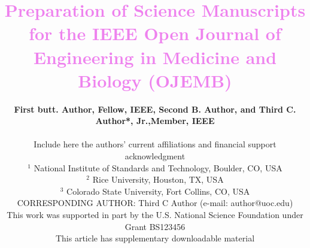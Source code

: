 \documentclass[journal]{IEEEtran}
\makeatletter
\renewcommand{\abstractname}{\textcolor{violet}{\textbf{ABSTRACT}} }
\def\abstract{\@IEEEtweakunitybaselinestretch{1.15}
	\@IEEEabskeysecsize\noindent\abstractname---\relax
	\fi\@IEEEgobbleleadPARNLSP}
\makeatother
\begin{document}
    
	\title{\vspace*{0.5cm}\textcolor{violet}{Preparation of Science Manuscripts for the IEEE Open Journal of Engineering in Medicine and Biology (OJEMB)}
	\vspace*{0.5cm}
	}	
	
	
	\author{\textbf{First butt. Author, Fellow, IEEE, Second B. Author, and Third C. Author*, Jr.,Member, IEEE}\\
		\vspace*{0.1cm}
		
		Include here the authors’ current affiliations and financial support acknowledgment \\
		\vspace*{0.2cm}
		\small
		$^{1}$ National Institute of Standards and Technology, Boulder, CO, USA \\
		$^{2}$ Rice University, Houston, TX, USA \\
		$^{3}$ Colorado State University, Fort Collins, CO, USA \\
		\vspace*{0.1cm}
		CORRESPONDING AUTHOR: Third C Author (e-mail: author@uoc.edu)\\
		\vspace*{0.1cm}
		This work was supported in part by the U.S. National Science Foundation under Grant BS123456\\
		This article has supplementary downloadable material
		\normalsize
		
	}


	
\end{document}
